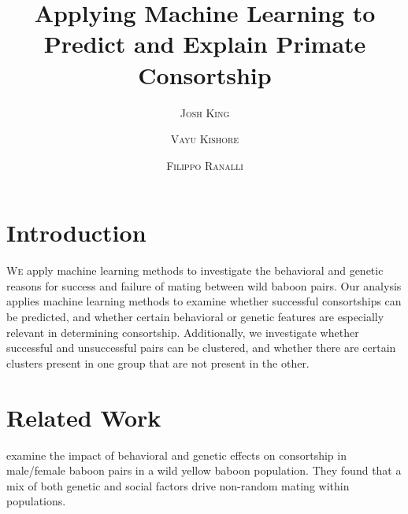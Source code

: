 \documentclass[twoside,twocolumn,paper=letter,fontsize=11pt]{article}
\title{Applying Machine Learning to Predict and Explain Primate Consortship} %
\author{%
\textsc{Josh King} \\[1ex] 
\and 
\textsc{Vayu Kishore} \\[1ex] 
\and 
\textsc{Filippo Ranalli} \\[1ex] 
}
\date{} %
\begin{document}
\maketitle

\section{Introduction}


\lettrine[nindent=0em,lines=3]{W}e apply machine learning methods to
investigate the behavioral and genetic reasons for success and failure of
mating between wild baboon pairs. Our analysis applies machine learning methods
to examine whether successful consortships can be predicted, and whether
certain behavioral or genetic features are especially relevant in determining
consortship. Additionally, we investigate whether successful and unsuccessful
pairs can be clustered, and whether there are certain clusters present in one
group that are not present in the other.


\section{Related Work}

\cite{Tung:2012} examine the impact of behavioral and genetic effects on
consortship in male/female baboon pairs in a wild yellow baboon population. They
found that a mix of both genetic and social factors drive non-random mating
within populations.
\end{document}
